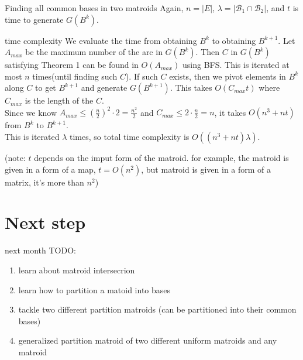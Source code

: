 \documentclass[11pt,xcolor=dvipsnames,table,dvipdfmx]{beamer}
\begin{document}
\begin{frame}{Finding all common bases in two matroids}
 Again, $n = |E|$, $\lambda = |\mathcal{B}_1 \cap \mathcal{B}_2|$, and $t$ is time to generate $G(B^k)$.
 \begin{block}{time complexity}
  We evaluate the time from obtaining $B^k$ to obtaining $B^{k+1}$. Let $A_{max}$ be the maximum number of the arc in $G(B^k)$. Then $C$ in $G(B^k)$ satisfying Theorem 1 can be found in $O(A_{max})$ using BFS. This is iterated at most $n$ times(until finding such $C$). If such $C$ exists, then we pivot elements in $B^k$ along $C$ to get $B^{k+1}$ and generate $G(B^{k+1})$. This takes $O(C_{max}t)$ where $C_{max}$ is the length of the $C$.\\
  Since we know $A_{max} \leq (\frac{n}{2})^2 \cdot 2 = \frac{n^2}{2}$ and $C_{max}\leq 2 \cdot \frac{n}{2} = n$, it takes $O(n^3 + nt)$ from $B^k$ to $B^{k+1}$.\\
This is iterated $\lambda$ times, so total time complexity is $O((n^3 + nt)\lambda)$.
 \end{block}
  (note: $t$ depends on the imput form of the matroid. for example, the matroid is given in a form of a map, $t = O(n^2)$, but matroid is given in a form of a matrix, it's more than $n^2$)
\end{frame}

\section{Next step}
\begin{frame}{next month}
 TODO:
 \begin{enumerate}
  \item learn about matroid intersecrion
  \item learn how to partition a matoid into bases
  \item tackle two different partition matroids (can be partitioned into their common bases)
  \item generalized partition matroid of two different uniform matroids and any matroid
 \end{enumerate}
\end{frame}
\end{document}
